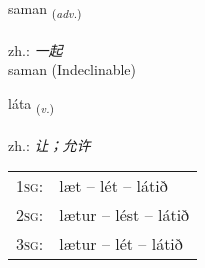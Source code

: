 \documentclass[frontgrid, backgrid]{flacards}\usepackage[]{graphicx}\usepackage[]{xcolor}
\begin{document}
\renewcommand{\flhead}{\vskip5pt \fboxsep=0pt {\small\bfseries\footnotesize Atviksorð | 副词}}
\renewcommand{\fcfoot}{\vskip5pt \fboxsep=0pt \hspace{2pt}{\small\bfseries\footnotesize 1K}}

\renewcommand{\blhead}{\vskip5pt {\small\bfseries\footnotesize Atviksorð | 副词 }}
\renewcommand{\bcfoot}{\vskip5pt \hspace{2pt}{\small\bfseries\footnotesize 1K}}


{saman \small{\textsubscript{(\textit{adv.})}} \\[1ex]
\textphonetic{[saːman]} \\
zh.: \emph{一起} \\  [2ex]
saman (Indeclinable)}

\renewcommand{\flhead}{\vskip5pt \fboxsep=0pt {\small\bfseries\footnotesize Sagnorð | 动词}}
\renewcommand{\fcfoot}{\vskip5pt \fboxsep=0pt \hspace{2pt}{\small\bfseries\footnotesize 1K}}

\renewcommand{\blhead}{\vskip5pt {\small\bfseries\footnotesize Sagnorð | 动词 }}
\renewcommand{\bcfoot}{\vskip5pt \hspace{2pt}{\small\bfseries\footnotesize 1K}}


{láta \small{\textsubscript{(\textit{v.})}} \\[1ex] %
\textphonetic{[lauːta]} \\
zh.: \emph{让；允许} \\  [2ex]
\renewcommand*{\arraystretch}{0.8}
\begin{tabular}{p{1cm}l}
\textsc{1sg}: & læt -- lét -- látið \\ 
\textsc{2sg}: & lætur -- lést -- látið \\ 
\textsc{3sg}: & lætur -- lét -- látið \\ 
\end{tabular}
}


\renewcommand{\flhead}{\vskip5pt \fboxsep=0pt {\small\bfseries\footnotesize Forsetning | 介词}}
\renewcommand{\fcfoot}{\vskip5pt \fboxsep=0pt \hspace{2pt}{\small\bfseries\footnotesize 1K}}
\end{document}
